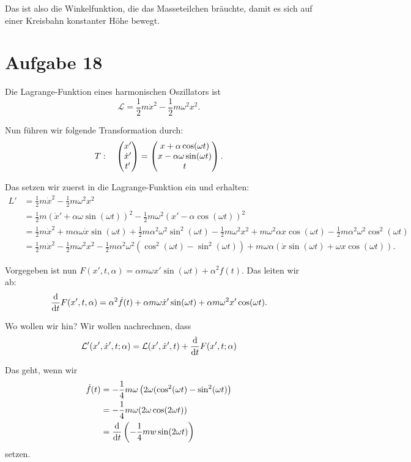Das ist also die Winkelfunktion, die das Masseteilchen bräuchte, damit es sich auf einer Kreisbahn konstanter Höhe bewegt.

\section*{Aufgabe 18}

Die Lagrange-Funktion eines harmonischen Oszillators ist 
\[
	\mathcal{L} = \frac{1}{2} m \dot{x}^2 - \frac{1}{2} m \omega^2 x^2 \text{.}
\]

Nun führen wir folgende Transformation durch:
\[
	T: \quad \begin{pmatrix} x' \\ \dot{x}' \\ t' \end{pmatrix} = \begin{pmatrix} x + \alpha \cos(\omega t) \\ x - \alpha \omega \sin(\omega t) \\ t \end{pmatrix}
	\text{.}
\]

Das setzen wir zuerst in die Lagrange-Funktion ein und erhalten:
\begin{align*}
	L' &= \frac{1}{2} m \dot{x}^2 - \frac{1}{2} m \omega^2 x^2	 \\
	&= \frac{1}{2} m (\dot{x}' + \alpha \omega \sin(\omega t))^2
	   - \frac{1}{2} m \omega^2 (x' - \alpha \cos(\omega t))^2 \\
	&= \frac{1}{2} m \dot{x}^2 
	   + m \alpha \omega \dot{x} \sin(\omega t) 
	   + \frac{1}{2} m \alpha^2 \omega^2 \sin^2(\omega t)
	   - \frac{1}{2} m \omega^2 x^2 
	   + m \omega^2 \alpha x \cos(\omega t)
	   - \frac{1}{2} m \alpha^2 \omega^2 \cos^2(\omega t) \\
	&= \frac{1}{2} m \dot{x}^2 - \frac{1}{2} m \omega^2 x^2
	   - \frac{1}{2} m \alpha^2 \omega^2 (\cos^2(\omega t) - \sin^2(\omega t))
	   + m \omega \alpha (\dot{x} \sin(\omega t) + \omega x \cos(\omega t))
	\text{.}
\end{align*}

Vorgegeben ist nun $F(x', t, \alpha) = \alpha m \omega x' \sin(\omega t) + \alpha^2 f(t)$. Das leiten wir ab:
\[
	\frac{\mathrm{d}}{\mathrm{d}t} F(x', t, \alpha) = \alpha^2 \dot{f}(t) + \alpha m \omega \dot{x}' \sin(\omega t) + \alpha m \omega^2 x' \cos(\omega t) \text{.}
\]

Wo wollen wir hin? Wir wollen nachrechnen, dass
\[
	\mathcal{L}'(x', \dot{x}', t; \alpha) = \mathcal{L}(x', \dot{x}', t) + \frac{\mathrm{d}}{\mathrm{d}t} F(x', t; \alpha)
\]

Das geht, wenn wir 
\begin{align*}
	\dot{f}(t) 
	&= - \frac{1}{4} m \omega \left( 2 \omega (\cos^2(\omega t) - \sin^2(\omega t) \right) \\
	&= - \frac{1}{4} m \omega (2 \omega \cos(2 \omega t)) \\
	&= \frac{\mathrm{d}}{\mathrm{d}t} \left( - \frac{1}{4} m w \sin(2 \omega t) \right)
\end{align*}
setzen.

